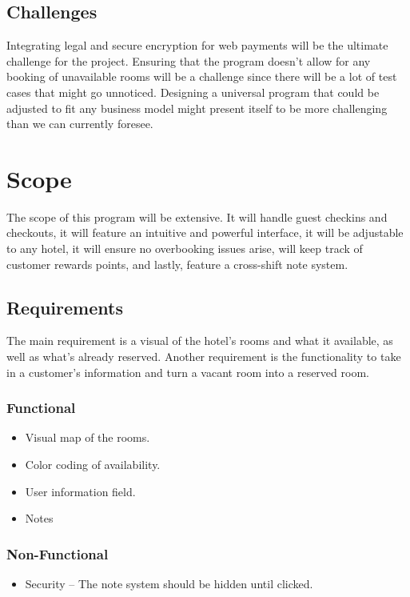 \documentclass[10pt,conference,onecolumn,compsoc]{IEEEtran}
\begin{document}
\subsection{Challenges}
Integrating legal and secure encryption for web payments will be the ultimate challenge for the project. 
Ensuring that the program doesn't allow for any booking of unavailable rooms will be a challenge since there will be a lot of test cases that might go unnoticed.
Designing a universal program that could be adjusted to fit any business model might present itself to be more challenging than we can currently foresee. 


\section{Scope}
The scope of this program will be extensive. It will handle guest checkins and checkouts, it will feature an intuitive and powerful interface, it will be adjustable to any hotel, it will ensure no overbooking issues arise, will keep track of customer rewards points, and lastly, feature a cross-shift note system. 

\subsection{Requirements}
The main requirement is a visual of the hotel's rooms and what it available, as well as what's already reserved. Another requirement is the functionality to take in a customer's information and turn a vacant room into a reserved room. 

\subsubsection{Functional}
\begin{itemize}
\item Visual map of the rooms.
\item Color coding of availability.
\item User information field.
\item Notes
\end{itemize}

\subsubsection{Non-Functional}
\begin{itemize}
\item Security -- The note system should be hidden until clicked.
\end{itemize}
\end{document}
